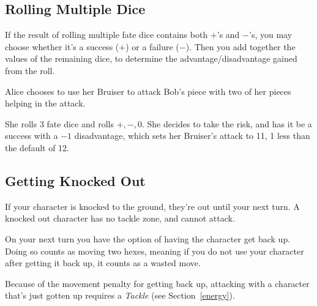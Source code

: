 \subsection{Rolling Multiple Dice}\label{sec:multidice} If the result of rolling multiple fate dice contains both $+$'s and $-$'s, you may choose whether it's a success ($+$) or a failure ($-$).
Then you add together the values of the remaining dice, to determine the advantage/disadvantage gained from the roll.

\begin{example}
    Alice chooses to use her Bruiser to attack Bob's piece with two of her pieces helping in the attack.
\end{example}
She rolls 3 fate dice and rolls $+, -, 0$.
She decides to take the risk, and has it be a success with a $-1$ disadvantage, which sets her Bruiser's attack to 11, 1 less than the default of 12.

\subsection{Getting Knocked Out}\label{sec:knockout}
If your character is knocked to the ground, they're out until your next turn.
A knocked out character has no tackle zone, and cannot attack.

On your next turn you have the option of having the character get back up.
Doing so counts as moving two hexes, meaning if you do not use your character after getting it back up, it counts as a wasted move.

\begin{note} 
Because of the movement penalty for getting back up, attacking with a character that's just gotten up requires a \textit{Tackle} (see Section~\ref{energy}).
\end{note}